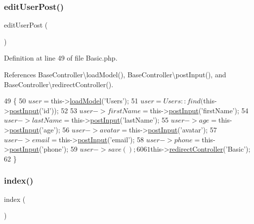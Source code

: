 \subsubsection{\texorpdfstring{edit\+User\+Post()}{editUserPost()}}
{\footnotesize\ttfamily edit\+User\+Post (\begin{DoxyParamCaption}{ }\end{DoxyParamCaption})}



Definition at line 49 of file Basic.\+php.



References Base\+Controller\textbackslash{}load\+Model(), Base\+Controller\textbackslash{}post\+Input(), and Base\+Controller\textbackslash{}redirect\+Controller().


\begin{DoxyCode}
49                                    \{
50         $user = $this->\hyperlink{class_base_controller_a5fa8890bd3a9d20f5c0cc2377dc49eb1}{loadModel}(\textcolor{stringliteral}{'Users'});
51         $user = Users::find($this->\hyperlink{class_base_controller_a170629218b28c1759a89c4978b9323b3}{postInput}(\textcolor{stringliteral}{'id'}));
52 
53         $user->firstName = $this->\hyperlink{class_base_controller_a170629218b28c1759a89c4978b9323b3}{postInput}(\textcolor{stringliteral}{'firstName'});
54         $user->lastName = $this->\hyperlink{class_base_controller_a170629218b28c1759a89c4978b9323b3}{postInput}(\textcolor{stringliteral}{'lastName'});
55         $user->age = $this->\hyperlink{class_base_controller_a170629218b28c1759a89c4978b9323b3}{postInput}(\textcolor{stringliteral}{'age'});
56         $user->avatar = $this->\hyperlink{class_base_controller_a170629218b28c1759a89c4978b9323b3}{postInput}(\textcolor{stringliteral}{'avatar'});
57         $user->email = $this->\hyperlink{class_base_controller_a170629218b28c1759a89c4978b9323b3}{postInput}(\textcolor{stringliteral}{'email'});
58         $user->phone = $this->\hyperlink{class_base_controller_a170629218b28c1759a89c4978b9323b3}{postInput}(\textcolor{stringliteral}{'phone'});
59         $user->save();
60 
61         $this->\hyperlink{class_base_controller_a85ddb683efc64655be063b697f631beb}{redirectController}(\textcolor{stringliteral}{'Basic'});
62     \}
\end{DoxyCode}
\hypertarget{class_basic_a149eb92716c1084a935e04a8d95f7347}{}\label{class_basic_a149eb92716c1084a935e04a8d95f7347} 
\subsubsection{\texorpdfstring{index()}{index()}}
{\footnotesize\ttfamily index (\begin{DoxyParamCaption}{ }\end{DoxyParamCaption})}



